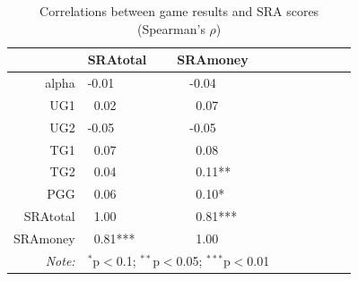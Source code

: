 \documentclass[12pt]{article}
\begin{document}
{\begin{table}[!htbp] \centering 
  \caption{Correlations between game results and SRA scores (Spearman\rq s \(\rho\))} 
  \label{} 
\centering
\begin{tabular}{rllllllll}
  \hline
 & SRAtotal & SRAmoney \\ 
  \hline
alpha  & -0.01  & \ \ -0.04  \\ 
  UG1  &  \ 0.02  &  \ \ \ 0.07  \\ 
  UG2 & -0.05  & \ \ -0.05  \\ 
  TG1 &  \ 0.07  &  \ \ \ 0.08  \\ 
  TG2  &  \ 0.04  & \ \ \  0.11** \\ 
  PGG  & \  0.06  &  \ \ \ 0.10* \\ 
  SRAtotal &  \ 1.00  &  \ \ \ 0.81*** \\ 
  SRAmoney  &  \ 0.81*** &  \ \ \ 1.00  \\ 
   \hline
   \textit{Note:}  & \multicolumn{2}{r}{$^{*}$p$<$0.1; $^{**}$p$<$0.05; $^{***}$p$<$0.01} \\ 
\end{tabular}
\end{table}


}
\end{document}
